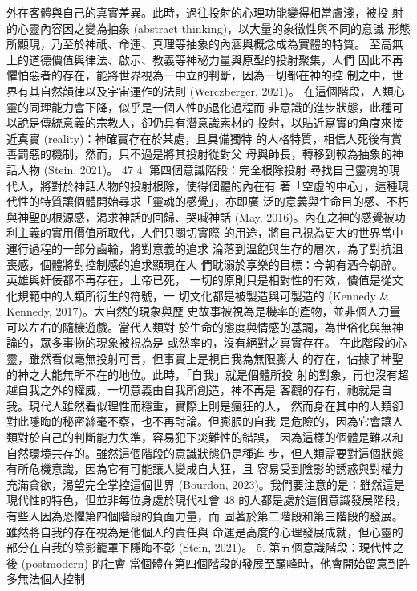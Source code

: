 外在客體與自己的真實差異。此時，過往投射的心理功能變得相當膚淺，被投
射的心靈內容因之變為抽象 (abstract thinking)，以大量的象徵性與不同的意識
形態所顯現，乃至於神祇、命運、真理等抽象的內涵與概念成為實體的特質。
至高無上的道德價值與律法、啟示、教義等神秘力量與原型的投射聚集，人們
因此不再懼怕惡者的存在，能將世界視為一中立的判斷，因為一切都在神的控
制之中，世界有其自然韻律以及宇宙運作的法則 (Werczberger, 2021)。 
在這個階段，人類心靈的同理能力會下降，似乎是一個人性的退化過程而
非意識的進步狀態，此種可以說是傳統意義的宗教人，卻仍具有潛意識素材的
投射，以貼近寫實的角度來接近真實 (reality)：神確實存在於某處，且具備獨特
的人格特質，相信人死後有賞善罰惡的機制，然而，只不過是將其投射從對父
母與師長，轉移到較為抽象的神話人物 (Stein, 2021)。 
47 
4. 第四個意識階段：完全根除投射 
尋找自己靈魂的現代人，將對於神話人物的投射根除，使得個體的內在有
著「空虛的中心」，這種現代性的特質讓個體開始尋求「靈魂的感覺」，亦即廣
泛的意義與生命目的感、不朽與神聖的根源感，渴求神話的回歸、哭喊神話 
(May, 2016)。內在之神的感覺被功利主義的實用價值所取代，人們只關切實際
的用途，將自己視為更大的世界當中運行過程的一部分齒輪，將對意義的追求
淪落到溫飽與生存的層次，為了對抗沮喪感，個體將對控制感的追求顯現在人
們耽溺於享樂的目標：今朝有酒今朝醉。英雄與奸佞都不再存在，上帝已死，
一切的原則只是相對性的有效，價值是從文化規範中的人類所衍生的符號，一
切文化都是被製造與可製造的 (Kennedy & Kennedy, 2017)。大自然的現象與歷
史故事被視為是機率的產物，並非個人力量可以左右的隨機遊戲。當代人類對
於生命的態度與情感的基調，為世俗化與無神論的，眾多事物的現象被視為是
或然率的，沒有絕對之真實存在。 
在此階段的心靈，雖然看似毫無投射可言，但事實上是視自我為無限膨大
的存在，佔據了神聖的神之大能無所不在的地位。此時，「自我」就是個體所投
射的對象，再也沒有超越自我之外的權威，一切意義由自我所創造，神不再是
客觀的存有，祂就是自我。現代人雖然看似理性而穩重，實際上則是瘋狂的人，
然而身在其中的人類卻對此隱晦的秘密絲毫不察，也不再討論。但膨脹的自我
是危險的，因為它會讓人類對於自己的判斷能力失準，容易犯下災難性的錯誤，
因為這樣的個體是難以和自然環境共存的。雖然這個階段的意識狀態仍是種進
步，但人類需要對這個狀態有所危機意識，因為它有可能讓人變成自大狂，且
容易受到陰影的誘惑與對權力充滿貪欲，渴望完全掌控這個世界 (Bourdon, 
2023)。我們要注意的是：雖然這是現代性的特色，但並非每位身處於現代社會
48 
的人都是處於這個意識發展階段，有些人因為恐懼第四個階段的負面力量，而
固著於第二階段和第三階段的發展。雖然將自我的存在視為是他個人的責任與
命運是高度的心理發展成就，但心靈的部分在自我的陰影籠罩下隱晦不彰 
(Stein, 2021)。 
5. 第五個意識階段：現代性之後 (postmodern) 的社會 
當個體在第四個階段的發展至巔峰時，他會開始留意到許多無法個人控制
